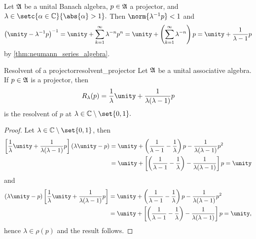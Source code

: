 Let \(\mathfrak{A}\) be a unital Banach algebra, \(p \in \mathfrak{A}\) a projector, and \(\lambda \in \setc{\alpha \in \mathbb{C}}{\abs{\alpha} > 1}.\) Then \(\norm{\lambda^{-1}p} < 1\) and
\begin{equation*}
    \left(\unity - \lambda^{-1}p\right)^{-1} = \unity + \sum_{k = 1}^{\infty} \lambda^{-n}p^n  = \unity + \left(\sum_{k=1}^\infty \lambda^{-n}\right)p =\unity + \frac{1}{\lambda - 1}p
\end{equation*}
by \cref{thm:neumann_series_algebra}. 
\begin{lemma}{Resolvent of a projector}{resolvent_projector}
    Let \(\mathfrak{A}\) be a unital associative algebra. If \(p\in\mathfrak{A}\) is a projector, then
    \begin{equation*}
        R_{\lambda}(p) = \frac{1}{\lambda}\unity + \frac{1}{\lambda(\lambda - 1)}p
    \end{equation*}
    is the resolvent of \(p\) at \(\lambda \in \mathbb{C} \setminus \set{0,1}.\)
\end{lemma}
\begin{proof}
    Let \(\lambda \in \mathbb{C}\setminus\set{0,1}\), then
    \begin{align*}
        \left[\frac1\lambda\unity + \frac1{\lambda(\lambda - 1)}p\right](\lambda \unity - p)
        &= \unity + \left(\frac{1}{\lambda-1} - \frac{1}{\lambda}\right)p - \frac{1}{\lambda(\lambda - 1)}p^2\\&= \unity + \left[\left(\frac{1}{\lambda-1} - \frac{1}{\lambda}\right) - \frac{1}{\lambda(\lambda - 1)}\right]p = \unity
    \end{align*}
    and
    \begin{align*}
        (\lambda \unity - p)\left[\frac1\lambda\unity + \frac1{\lambda(\lambda - 1)}p\right]
        &= \unity + \left(\frac{1}{\lambda-1} - \frac{1}{\lambda}\right)p - \frac{1}{\lambda(\lambda - 1)}p^2 \\&= \unity + \left[\left(\frac{1}{\lambda-1} - \frac{1}{\lambda}\right) - \frac{1}{\lambda(\lambda - 1)}\right]p = \unity,
    \end{align*}
    hence \(\lambda \in \rho(p)\) and the result follows.
\end{proof}

